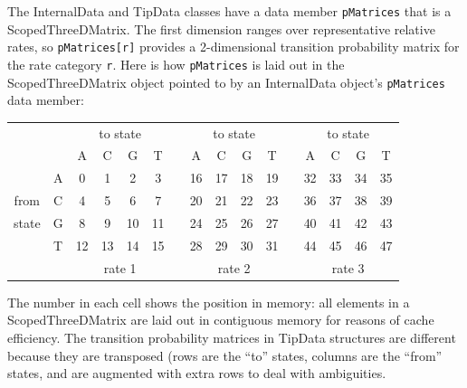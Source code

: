 The InternalData and TipData classes have a data member {\tt pMatrices} that is a ScopedThreeDMatrix. The first dimension ranges over representative relative rates, so {\tt pMatrices[r]} provides a 2-dimensional transition probability matrix for the rate category {\tt r}. Here is how {\tt pMatrices} is laid out in the ScopedThreeDMatrix object pointed to by an InternalData object's {\tt pMatrices} data member:

\resizebox{5.5in}{!} {
\begin{tabular}{cccccccccccccccc}
      &    & \multicolumn{4}{c}{to state} & & \multicolumn{4}{c}{to state} & & \multicolumn{4}{c}{to state}	\\
      &    & A  & C  & G  &  T & & A  & C  & G  &  T & & A  & C  & G  &  T \\  \cline{3-6} \cline{8-11} \cline{13-16}
      &  A & \multicolumn{1}{|c}{0} & 1  & 2  &  \multicolumn{1}{c|}{3} & & \multicolumn{1}{|c}{16} & 17 & 18 & \multicolumn{1}{c|}{19} & & \multicolumn{1}{|c}{32} & 33 & 34 & \multicolumn{1}{c|}{35} \\
from  &  C & \multicolumn{1}{|c}{4} & 5  & 6  &  \multicolumn{1}{c|}{7} & & \multicolumn{1}{|c}{20} & 21 & 22 & \multicolumn{1}{c|}{23} & & \multicolumn{1}{|c}{36} & 37 & 38 & \multicolumn{1}{c|}{39} \\
state &  G & \multicolumn{1}{|c}{8} & 9  & 10 &  \multicolumn{1}{c|}{11} & & \multicolumn{1}{|c}{24} & 25 & 26 & \multicolumn{1}{c|}{27} & & \multicolumn{1}{|c}{40} & 41 & 42 & \multicolumn{1}{c|}{43} \\
      &  T & \multicolumn{1}{|c}{12} & 13 & 14 & \multicolumn{1}{c|}{15} & & \multicolumn{1}{|c}{28} & 29 & 30 & \multicolumn{1}{c|}{31} & & \multicolumn{1}{|c}{44} & 45 & 46 & \multicolumn{1}{c|}{47} \\ \cline{3-6} \cline{8-11} \cline{13-16}
      &    & \multicolumn{4}{c}{rate 1} & & \multicolumn{4}{c}{rate 2} & & \multicolumn{4}{c}{rate 3}	\\
\end{tabular}
}

The number in each cell shows the position in memory: all elements in a ScopedThreeDMatrix are laid out in contiguous memory for reasons of cache efficiency. The transition probability matrices in TipData structures are different because they are transposed (rows are the ``to'' states, columns are the ``from'' states, and are augmented with extra rows to deal with ambiguities.



